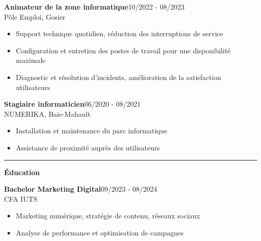 \documentclass[a4paper]{article}
\renewcommand{\colorbox}[2]{#2}%
\newcommand{\fullrule}{\hspace{-1.5cm}\rule{\paperwidth}{0.4pt}}
\newcommand{\cvsection}[1]{%
  \vspace{6pt}\textbf{\Large #1}\par\vspace{2pt}}
\begin{document}
\vspace{3mm}

\colorbox{maincolor}{%
  \begin{minipage}{\linewidth}
    \noindent
    \textbf{Animateur de la zone informatique}\hfill 10/2022 - 08/2023\\
    Pôle Emploi, Gosier\\[-0.3em]
    \begin{itemize}[leftmargin=*]
      \item Support technique quotidien, réduction des interruptions de service \item Configuration et entretien des postes de travail pour une disponibilité maximale \item Diagnostic et résolution d’incidents, amélioration de la satisfaction utilisateurs
    \end{itemize}
  \end{minipage}}

\vspace{3mm}

\colorbox{maincolor}{%
  \begin{minipage}{\linewidth}
    \noindent
    \textbf{Stagiaire informaticien}\hfill 06/2020 - 08/2021\\
    NUMERIKA, Baie-Mahault\\[-0.3em]
    \begin{itemize}[leftmargin=*]
      \item Installation et maintenance du parc informatique \item Assistance de proximité auprès des utilisateurs
    \end{itemize}
  \end{minipage}}

\medskip\fullrule

\cvsection{Éducation}

\colorbox{maincolor}{%
  \begin{minipage}{\linewidth}
    \noindent
    \textbf{Bachelor Marketing Digital}\hfill 09/2023 - 08/2024\\
    CFA IUTS\\[-0.3em]
    \begin{itemize}[leftmargin=*]
      \item Marketing numérique, stratégie de contenu, réseaux sociaux \item Analyse de performance et optimisation de campagnes
    \end{itemize}
  \end{minipage}}
\end{document}
